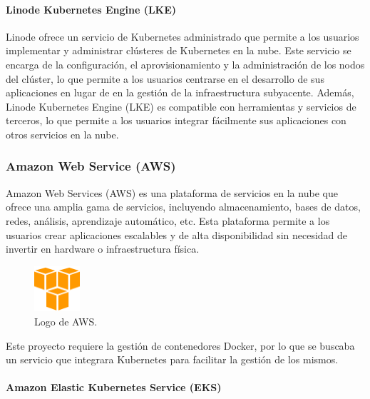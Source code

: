                 \paragraph{Linode Kubernetes Engine (LKE)}

                    Linode ofrece un servicio de Kubernetes administrado que permite a los usuarios implementar y administrar clústeres de Kubernetes en la nube. Este servicio se encarga de la configuración, el aprovisionamiento y la administración de los nodos del clúster, lo que permite a los usuarios centrarse en el desarrollo de sus aplicaciones en lugar de en la gestión de la infraestructura subyacente. Además, Linode Kubernetes Engine (LKE) es compatible con herramientas y servicios de terceros, lo que permite a los usuarios integrar fácilmente sus aplicaciones con otros servicios en la nube.

            \subsubsection{Amazon Web Service (AWS)}

                Amazon Web Services (AWS) es una plataforma de servicios en la nube que ofrece una amplia gama de servicios, incluyendo almacenamiento, bases de datos, redes, análisis, aprendizaje automático, etc. Esta plataforma permite a los usuarios crear aplicaciones escalables y de alta disponibilidad sin necesidad de invertir en hardware o infraestructura física.

                \begin{figure}[htbp!]
                    \centering

                    \includegraphics[width=0.15\textwidth]{images/Logos/aws.png}
                    \caption{Logo de AWS.}

                    \label{fig:aws-logo}
                \end{figure}

                Este proyecto requiere la gestión de contenedores Docker, por lo que se buscaba un servicio que integrara Kubernetes para facilitar la gestión de los mismos.

                \paragraph{Amazon Elastic Kubernetes Service (EKS)}

